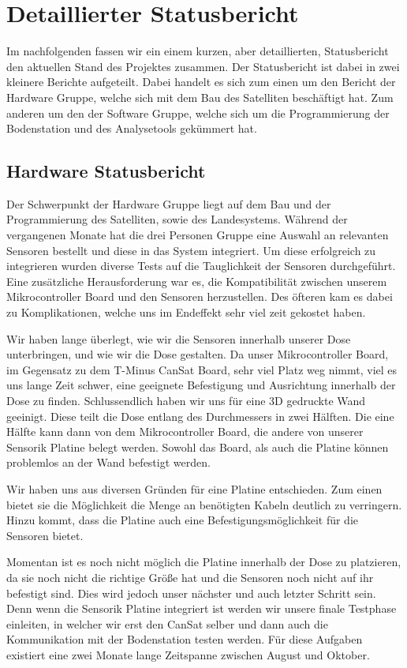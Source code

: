 \section{Detaillierter Statusbericht}
Im nachfolgenden fassen wir ein einem kurzen, aber detaillierten, Statusbericht den aktuellen Stand des Projektes zusammen. Der Statusbericht ist dabei in zwei kleinere Berichte aufgeteilt. Dabei handelt es sich zum einen um den Bericht der Hardware Gruppe, welche sich mit dem Bau des Satelliten beschäftigt hat. Zum anderen um den der Software Gruppe, welche sich um die Programmierung der Bodenstation und des Analysetools gekümmert hat.

\subsection{Hardware Statusbericht}
Der Schwerpunkt der Hardware Gruppe liegt auf dem Bau und der Programmierung des Satelliten, sowie des Landesystems. Während der vergangenen Monate hat die drei Personen Gruppe eine Auswahl an relevanten Sensoren bestellt und diese in das System integriert. Um diese erfolgreich zu integrieren wurden diverse Tests auf die Tauglichkeit der Sensoren durchgeführt. Eine zusätzliche Herausforderung war es, die Kompatibilität zwischen unserem Mikrocontroller Board und den Sensoren herzustellen. Des öfteren kam es dabei zu Komplikationen, welche uns im Endeffekt sehr viel zeit gekostet haben.

Wir haben lange überlegt, wie wir die Sensoren innerhalb unserer Dose unterbringen, und wie wir die Dose gestalten. Da unser Mikrocontroller Board, im Gegensatz zu dem T-Minus CanSat Board, sehr viel Platz weg nimmt, viel es uns lange Zeit schwer, eine geeignete Befestigung und Ausrichtung innerhalb der Dose zu finden. Schlussendlich haben wir uns für eine 3D gedruckte Wand geeinigt. Diese teilt die Dose entlang des Durchmessers in zwei Hälften. Die eine Hälfte kann dann von dem Mikrocontroller Board, die andere von unserer Sensorik Platine belegt werden. Sowohl das Board, als auch die Platine können problemlos an der Wand befestigt werden.

Wir haben uns aus diversen Gründen für eine Platine entschieden. Zum einen bietet sie die Möglichkeit die Menge an benötigten Kabeln deutlich zu verringern. Hinzu kommt, dass die Platine auch eine Befestigungsmöglichkeit für die Sensoren bietet.

Momentan ist es noch nicht möglich die Platine innerhalb der Dose zu platzieren, da sie noch nicht die richtige Größe hat und die Sensoren noch nicht auf ihr befestigt sind. Dies wird jedoch unser nächster und auch letzter Schritt sein. Denn wenn die Sensorik Platine integriert ist werden wir unsere finale Testphase einleiten, in welcher wir erst den CanSat selber und dann auch die Kommunikation mit der Bodenstation testen werden. Für diese Aufgaben existiert eine zwei Monate lange Zeitspanne zwischen August und Oktober.

